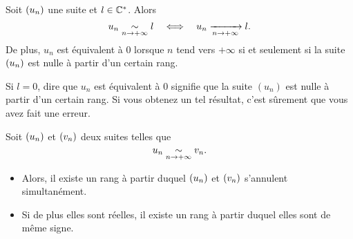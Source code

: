 \documentclass{magnolia}
\begin{document}

\begin{proposition}[utile=-3]
Soit $\left(u_n\right)$ une suite et $l\in\mathbb{C}^*$. Alors
\[u_n \underset{n\rightarrow +\infty}{\sim} l \quad\Longleftrightarrow\quad u_n \xrightarrow[n\rightarrow +\infty]{} l.\]
De plus, $u_n$ est équivalent à 0 lorsque $n$ tend vers $+\infty$ si et
seulement si la suite $\left(u_n\right)$ est nulle à partir d'un certain rang.
\end{proposition}

\begin{remarqueUnique}
\remarque
  Si $l=0$, dire que $u_n$ est équivalent à 0 signifie que la
  suite $(u_n)$ est nulle à partir d'un certain rang.
  Si vous obtenez un tel résultat, c'est sûrement que vous avez
  fait une erreur.
\end{remarqueUnique}


\begin{proposition}[utile=-3]
Soit $\left(u_n\right)$ et $\left(v_n\right)$ deux suites telles que
\[u_n \underset{n\rightarrow +\infty}{\sim} v_n.\]
\begin{itemize}
\item Alors, il existe un rang à partir duquel $\left(u_n\right)$ et $\left(v_n\right)$ s'annulent
  simultanément.
\item Si de plus elles sont réelles, il existe un rang à partir duquel elles
  sont de même signe. 
\end{itemize}
\end{proposition}
\end{document}
